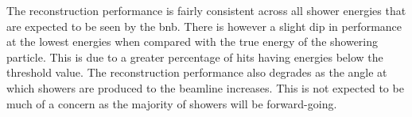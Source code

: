 The reconstruction performance is fairly consistent across all shower energies that are expected to be seen by the \gls{bnb}. There is however a slight dip in performance at the lowest energies when compared with the true energy of the showering particle. This is due to a greater percentage of hits having energies below the threshold value. The reconstruction performance also degrades as the angle at which showers are produced to the beamline increases. This is not expected to be much of a concern as the majority of showers will be forward-going. 

